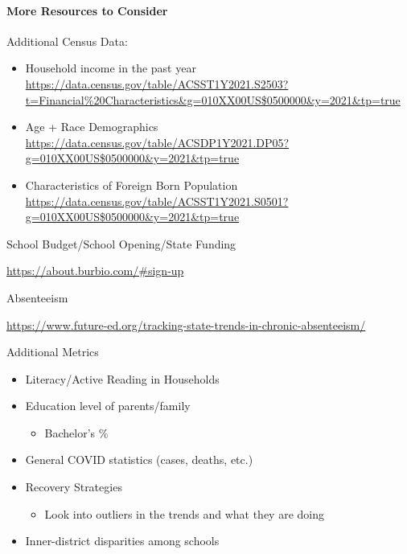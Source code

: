 \documentclass[
  letterpaper,
  DIV=11,
  numbers=noendperiod]{scrartcl}
\let\oldparagraph\paragraph
\renewcommand{\paragraph}[1]{\oldparagraph{#1}\mbox{}}
\providecommand{\tightlist}{%
  \setlength{\itemsep}{0pt}\setlength{\parskip}{0pt}}\usepackage{longtable,booktabs,array}
\begin{document}
\hypertarget{more-resources-to-consider}{%
\paragraph{More Resources to
Consider}\label{more-resources-to-consider}}

Additional Census Data:

\begin{itemize}
\item
  Household income in the past year\\
  \url{https://data.census.gov/table/ACSST1Y2021.S2503?t=Financial\%20Characteristics\&g=010XX00US$0500000\&y=2021\&tp=true}
\item
  Age + Race Demographics\\
  \url{https://data.census.gov/table/ACSDP1Y2021.DP05?g=010XX00US$0500000\&y=2021\&tp=true}
\item
  Characteristics of Foreign Born Population\\
  \url{https://data.census.gov/table/ACSST1Y2021.S0501?g=010XX00US$0500000\&y=2021\&tp=true}
\end{itemize}

School Budget/School Opening/State Funding

\url{https://about.burbio.com/\#sign-up}

Absenteeism

\url{https://www.future-ed.org/tracking-state-trends-in-chronic-absenteeism/}

Additional Metrics

\begin{itemize}
\item
  Literacy/Active Reading in Households
\item
  Education level of parents/family

  \begin{itemize}
  \tightlist
  \item
    Bachelor's \%
  \end{itemize}
\item
  General COVID statistics (cases, deaths, etc.)
\item
  Recovery Strategies

  \begin{itemize}
  \tightlist
  \item
    Look into outliers in the trends and what they are doing
  \end{itemize}
\item
  Inner-district disparities among schools
\end{itemize}
\end{document}

